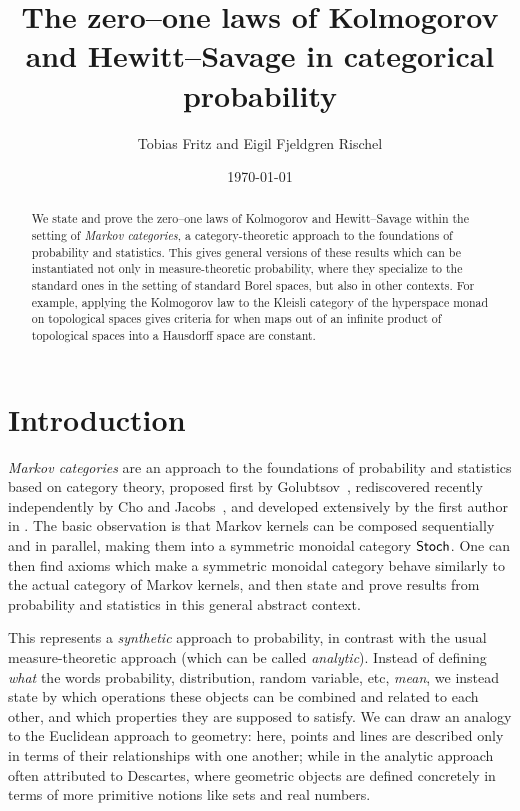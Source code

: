 \documentclass[11pt]{article}
\author{Tobias Fritz and Eigil Fjeldgren Rischel}
\title{The zero--one laws of Kolmogorov and Hewitt--Savage in categorical probability}
\date{\today}
\begin{document}
\maketitle

\begin{abstract}
	We state and prove the zero--one laws of Kolmogorov and Hewitt--Savage within the setting of \emph{Markov categories}, a category-theoretic approach to the foundations of probability and statistics. This gives general versions of these results which can be instantiated not only in measure-theoretic probability, where they specialize to the standard ones in the setting of standard Borel spaces, but also in other contexts. For example, applying the Kolmogorov law to the Kleisli category of the hyperspace monad on topological spaces gives criteria for when maps out of an infinite product of topological spaces into a Hausdorff space are constant.
\end{abstract}

\tableofcontents

\section{Introduction}

\emph{Markov categories} are an approach to the foundations of probability and statistics based on category theory, proposed first by Golubtsov~\cite{golubtsov}, rediscovered recently independently by Cho and Jacobs~\cite{cho_jacobs}, and developed extensively by the first author in \cite{markov_cats}. The basic observation is that Markov kernels can be composed sequentially and in parallel, making them into a symmetric monoidal category $\operatorname{\mathsf{Stoch}}$. One can then find axioms which make a symmetric monoidal category behave similarly to the actual category of Markov kernels, and then state and prove results from probability and statistics in this general abstract context.

This represents a \emph{synthetic} approach to probability, in contrast with the usual measure-theoretic approach (which can be called \emph{analytic}). Instead of defining \emph{what} the words probability, distribution, random variable, etc, \emph{mean}, we instead state by which operations these objects can be combined and related to each other, and which properties they are supposed to satisfy.
We can draw an analogy to the Euclidean approach to geometry: here, points and lines are described only in terms of their relationships with one another; while in the analytic approach often attributed to Descartes, where geometric objects are defined concretely in terms of more primitive notions like sets and real numbers.
\end{document}
